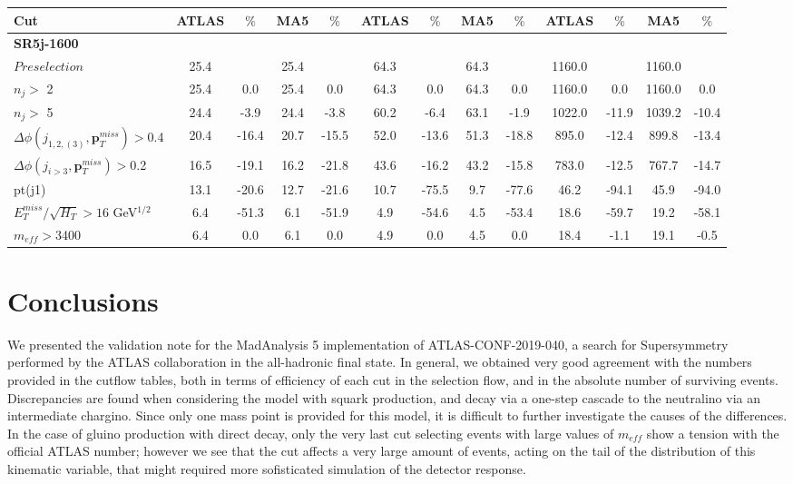 \documentclass[a4paper,11pt]{article}
\begin{document}
\begin{landscape}
\begin{table}[h]
\begin{tabular}{ | l | c c c c  || c c c c || c c c c | }
			\textbf{Cut} & \textbf{ATLAS} & $\%$ & \textbf{MA5} & $\%$ & \textbf{ATLAS} & $\%$ & \textbf{MA5} & $\%$ &\textbf{ATLAS} & $\%$ & \textbf{MA5} & $\%$ \\ \hline \hline
		\multicolumn{13}{|l|}{\textbf{SR5j-1600}} \\ \hline	

$Preselection$&25.4&&25.4&&64.3&&64.3&&1160.0&&1160.0&
\\
$n_j>$ 2&25.4&0.0&25.4&0.0&64.3&0.0&64.3&0.0&1160.0&0.0&1160.0&0.0
\\
$n_j>$ 5&24.4&-3.9&24.4&-3.8&60.2&-6.4&63.1&-1.9&1022.0&-11.9&1039.2&-10.4
\\
$\Delta \phi(j_{1,2,(3)},\mathbf{p}_T^{miss})>$0.4&20.4&-16.4&20.7&-15.5&52.0&-13.6&51.3&-18.8&895.0&-12.4&899.8&-13.4
\\
$\Delta \phi(j_{i>3},\mathbf{p}_T^{miss})>$0.2&16.5&-19.1&16.2&-21.8&43.6&-16.2&43.2&-15.8&783.0&-12.5&767.7&-14.7
\\
pt(j1)&13.1&-20.6&12.7&-21.6&10.7&-75.5&9.7&-77.6&46.2&-94.1&45.9&-94.0
\\
$E_T^{miss}/\sqrt{H_T}>16 $ GeV$^{1/2}$&6.4&-51.3&6.1&-51.9&4.9&-54.6&4.5&-53.4&18.6&-59.7&19.2&-58.1
\\
$m_{eff}>$3400&6.4&0.0&6.1&0.0&4.9&0.0&4.5&0.0&18.4&-1.1&19.1&-0.5 \\


				\bottomrule \bottomrule
\end{tabular}



\end{table}	


	\end{landscape}


	\section{Conclusions}
	We presented the validation note for the MadAnalysis 5 implementation of ATLAS-CONF-2019-040, a search for Supersymmetry performed by the ATLAS collaboration in the all-hadronic final state.
	In general, we obtained very good agreement with the numbers provided in the cutflow tables, both in terms of efficiency of each cut in the selection flow, and in the absolute number of surviving events.
	Discrepancies are found when considering the model with squark production, and decay via a one-step cascade to the neutralino via an intermediate chargino. Since only one mass point is provided for this model, it is difficult to further investigate the causes of the differences.  
	In the case of gluino production with direct decay, only the very last cut selecting events with large values of $m_{eff}$ show a tension with the official ATLAS number; however we see that the cut affects a very large amount of events, acting on the tail of the distribution of this kinematic variable, that might required more sofisticated simulation of the detector response. 
	
	
	
	
	
	
	
\end{document}
